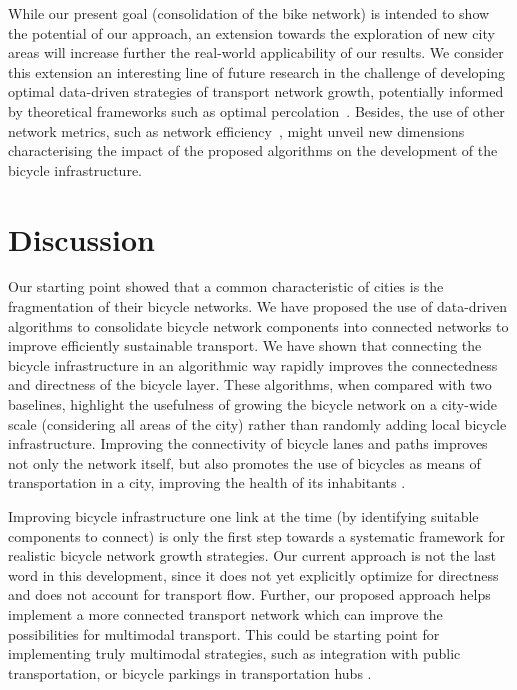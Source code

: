 While our present goal (consolidation of the bike network) is intended to show the potential of our approach, an extension towards the exploration of new city areas will increase further the real-world applicability of our results. We consider this extension an interesting line of future research in the challenge of developing optimal data-driven strategies of transport network growth, potentially informed by theoretical frameworks such as optimal percolation~\cite{achlioptas2009explosive,morone2015influence}. Besides, the use of other network metrics, such as network efficiency~\cite{latora2000efficient}, might unveil new dimensions characterising the impact of the proposed algorithms on the development of the bicycle infrastructure.


\section{Discussion}
Our starting point showed that a common characteristic of cities is the fragmentation of their bicycle networks. We have proposed the use of data-driven algorithms to consolidate bicycle network components into connected networks to improve efficiently sustainable transport. We have shown that connecting the bicycle infrastructure in an algorithmic way rapidly improves the connectedness and directness of the bicycle layer. These algorithms, when compared with two baselines, highlight the usefulness of growing the bicycle network on a city-wide scale (considering all areas of the city) rather than randomly adding local bicycle infrastructure. Improving the connectivity of bicycle lanes and paths improves not only the network itself, but also promotes the use of bicycles as means of transportation in a city, improving the health of its inhabitants \cite{Mueller2018Health}.

Improving bicycle infrastructure one link at the time (by identifying suitable components to connect) is only the first step towards a systematic framework for realistic bicycle network growth strategies. Our current approach is not the last word in this development, since it does not yet explicitly optimize for directness and does not account for transport flow. Further, our proposed approach helps implement a more connected transport network which can improve the possibilities for multimodal transport. This could be starting point for implementing truly multimodal strategies, such as integration with public transportation, or bicycle parkings in transportation hubs \cite{Twaddell2018Multimodal}.

